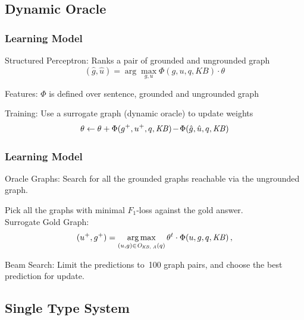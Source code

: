 \documentclass[mathserif,12pt]{beamer}
\newcommand{\argmax}{\operatornamewithlimits{arg\,max}}
\newcommand{\hlight}[1]{{\color{blue!80} #1}}
\begin{document}
\subsection{Dynamic Oracle}
\begin{frame}[noframenumbering]
\frametitle{Learning Model}

\hlight{Structured Perceptron:} Ranks a pair of
grounded and ungrounded graph $$(\hat{g},\hat{u}) = \arg\max\limits_{g,u}
                        \Phi(g,u,q,\mathit{KB}) \cdot \theta$$

\pause

\vspace{0.5cm}
\hlight{Features:} $\Phi$ is defined over sentence, grounded and
ungrounded graph

\vspace{1cm}

\pause
\hlight{Training:} Use a surrogate graph (dynamic oracle) to update weights 
$$\theta \leftarrow \theta +
\Phi(g^+,u^+,q,\mathit{KB})\hspace{-.3ex}-\hspace{-.3ex}\Phi(\hat{g},\hat{u},q,\mathit{KB})$$


\end{frame}

\begin{frame}[noframenumbering]
\frametitle{Learning Model}

\hlight{Oracle Graphs: } Search for all the grounded graphs reachable via the ungrounded graph. 

\vspace{0.5cm}
Pick all the graphs with minimal $F_1$-loss against the gold answer. \\

\vspace{0.5cm}
\hlight{Surrogate Gold Graph: }
$$(u^{+},{g^{+}}) = \argmax_{(u,g) \in \mathit{O}_{\mathit{KB},\;\mathit{A}}(q)} \theta^{t} \cdot \Phi({u,g,q,\mathit{KB}})\,,$$

\vspace{0.5cm}
\hlight{Beam Search: } Limit the predictions to~100 graph pairs, and choose the best prediction for update.
\end{frame}

\subsection{Single Type System}
\end{document}
